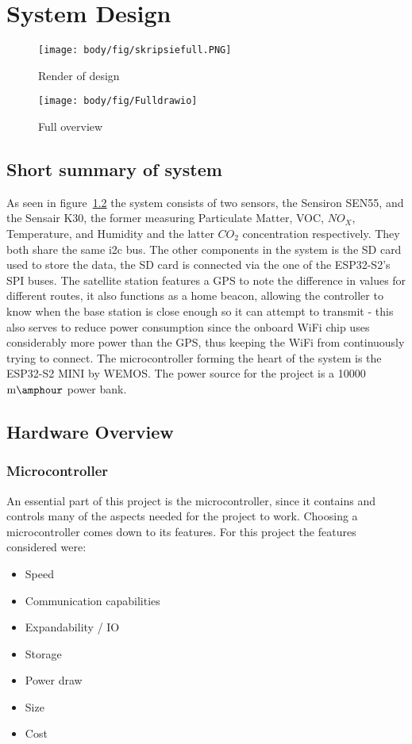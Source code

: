 \chapter{System Design}
\vspace{-5em}

\begin{figure}[!htb]
	\centering
	\texttt{[image: body/fig/skripsiefull.PNG]}
	\caption{Render of design  }
	\label{fig:render}
\end{figure}
\vspace{-2em}
\begin{figure}[!htb]
	\centering
	\texttt{[image: body/fig/Fulldrawio]}
	\caption{ Full overview}
	\label{fig:fulldrawio}
\end{figure}
\vspace{-2em}
\section{Short summary of system}
As seen in figure~\ref{fig:fulldrawio} the system consists of two sensors, the Sensiron SEN55, and the Sensair K30, the former measuring Particulate Matter, VOC, $NO_X$, Temperature, and Humidity and the latter $CO_2$ concentration respectively. They both share the same i2c bus. The other components in the system is the SD card used to store the data, the SD card is connected via the one of the ESP32-S2's SPI buses. The satellite station features a GPS to note the difference in values for different routes, it also functions as a home beacon, allowing the controller to know when the base station is close enough so it can attempt to transmit - this also serves to reduce power consumption since the onboard WiFi chip uses considerably more power than the GPS, thus keeping the WiFi from continuously trying to connect. The microcontroller forming the heart of the system is the ESP32-S2 MINI by WEMOS. The power source for the project is a 10000$ \si{\milli\amphour} $ power bank.

\section{Hardware Overview}


\subsection{Microcontroller}
An essential part of this project is the microcontroller, since it contains and controls many of the aspects needed for the project to work.
Choosing a microcontroller comes down to its features. For this project the features considered were:
\begin{itemize}
	\item Speed
	\item Communication capabilities
	\item Expandability / IO
	\item Storage
	\item Power draw
	\item Size
	\item Cost
\end{itemize}

